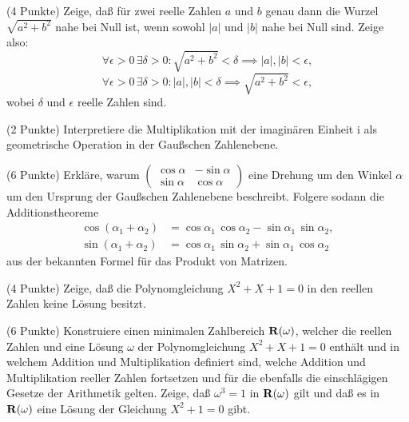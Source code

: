 \documentclass{algsheet}
\begin{document}
\begin{exercise}(4 Punkte)\newline
    Zeige, daß für zwei reelle Zahlen $a$ und $b$ genau dann die Wurzel
    $\sqrt{a^2 + b^2}$ nahe bei Null ist, wenn sowohl $|a|$ und $|b|$
    nahe bei Null sind. Zeige also:
    \[    \forall \epsilon > 0\, \exists \delta > 0  \colon 
            \sqrt{a^2 + b^2} < \delta  \implies |a|, |b| < \epsilon,
    \]
      \[
        \forall \epsilon > 0\, \exists \delta > 0  \colon 
            |a|, |b| < \delta  \implies \sqrt{a^2  + b^2} < \epsilon,
    \]
    wobei \(\delta\) und \(\epsilon\) reelle Zahlen sind.
\end{exercise}

\begin{exercise}(2 Punkte)\newline
    Interpretiere die Multiplikation mit der imaginären Einheit \(\mathrm i\)
    als geometrische Operation in der Gaußschen Zahlenebene.
\end{exercise}

\begin{exercise}(6 Punkte)\newline
    Erkläre, warum \(\left(\begin{smallmatrix}
                               \cos \alpha & - \sin \alpha\\
                               \sin \alpha & \cos \alpha
                           \end{smallmatrix}\right)\) eine Drehung um den Winkel \(\alpha\) um
    den Ursprung der Gaußschen Zahlenebene beschreibt. Folgere sodann
    die Additionstheoreme
    \begin{align*}
        \cos (\alpha_1 + \alpha_2) & = \cos \alpha_1 \, \cos \alpha_2
            - \sin \alpha_1 \, \sin \alpha_2,
        \\
        \sin (\alpha_1 + \alpha_2) & = \cos \alpha_1 \, \sin \alpha_2
            + \sin \alpha_1 \, \cos \alpha_2
    \end{align*}
    aus der bekannten Formel für das Produkt von Matrizen.
\end{exercise}

\begin{exercise}(4 Punkte)\newline
    Zeige, daß die Polynomgleichung \(X^2 + X + 1 = 0\) in den reellen Zahlen
    keine Lösung besitzt.
\end{exercise}

\begin{exercise}(6 Punkte)\newline
    Konstruiere einen minimalen Zahlbereich \(\mathbf R(\omega)\), welcher die
    reellen Zahlen und eine Lösung \(\omega\) der Polynomgleichung \(X^2 + X + 1 = 0\)
    enthält und in welchem Addition und Multiplikation definiert sind, welche
    Addition und Multiplikation reeller Zahlen fortsetzen und für die ebenfalls
    die einschlägigen Gesetze  der Arithmetik gelten. Zeige, daß \(\omega^3 = 1\)
    in \(\mathbf R(\omega)\) gilt und daß es in \(\mathbf R(\omega)\) eine Lösung
    der Gleichung \(X^2 + 1 = 0\) gibt.
\end{exercise}
\end{document}
